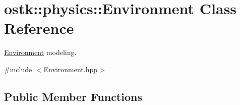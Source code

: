 \hypertarget{classostk_1_1physics_1_1_environment}{}\section{ostk\+:\+:physics\+:\+:Environment Class Reference}
\label{classostk_1_1physics_1_1_environment}


\hyperlink{classostk_1_1physics_1_1_environment}{Environment} modeling.  




{\ttfamily \#include $<$Environment.\+hpp$>$}

\subsection*{Public Member Functions}
